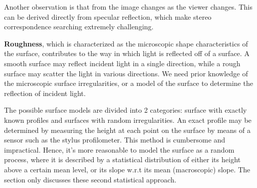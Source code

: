 Another observation is that from the image changes as the viewer changes. This can be derived directly from specular reflection, which make stereo correspondence searching extremely challenging.

\textbf{Roughness}, which is characterized as the microscopic shape characteristics of the surface, contributes to the way in which light is reflected off of a surface. A smooth surface may reflect incident light in a single direction, while a rough surface may scatter the light in various directions. We need prior knowledge of the microscopic surface irregularities, or a model of the surface to determine the reflection of incident light.

The possible surface models are divided into 2 categories: surface with exactly known profiles and surfaces with random irregularities. An exact profile may be determined by measuring the height at each point on the surface by means of a sensor such as the stylus profilometer. This method is cumbersome and impractical. Hence, it’s more reasonable to model the surface as a random process, where it is described by a statistical distribution of either its height above a certain mean level, or its slope w.r.t its mean (macroscopic) slope. The section only discusses these second statistical approach.






